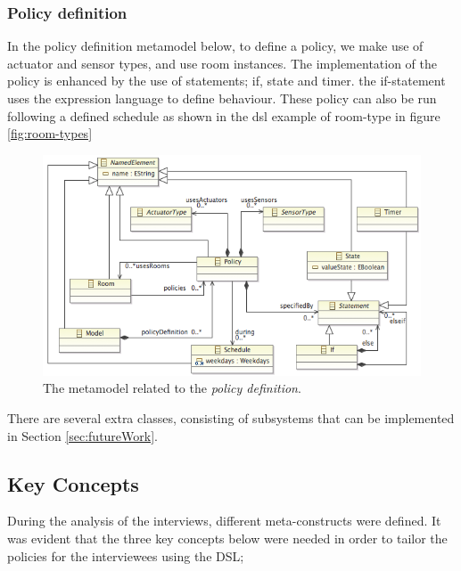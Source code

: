 \subsubsection{Policy definition}
In the policy definition metamodel below, to define a policy, we make use of actuator and sensor types, and use room instances. The implementation of the policy is enhanced by the use of statements; if, state and timer. the if-statement uses the expression language to define behaviour. These policy can also be run following a defined schedule as shown in the dsl example of room-type in figure \ref{fig:room-types} 
\begin{figure}[h]
  \centering
    \includegraphics[scale=.5]{ecore-policy-definition.png}	
	\caption{The metamodel related to the \textit{policy definition}.}
	\label{fig:ecore-policy-definition}
\end{figure}

There are several extra classes, consisting of subsystems that can be implemented in Section \ref{sec:futureWork}.

\subsection{Key Concepts}

During the analysis of the interviews, different meta-constructs were defined. It was evident that the three key concepts below were needed in order to tailor the policies for the interviewees using the DSL;

